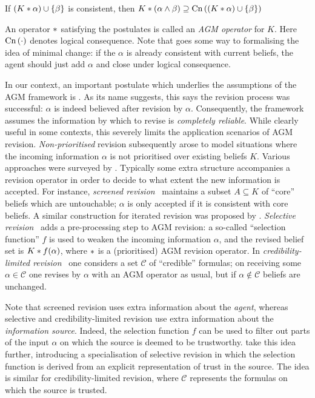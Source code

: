 {\begin{axiomlist}
    \begin{axiom}
        If $(K \ast \alpha) \cup \{\beta\}$ is consistent, then $K
        \ast (\alpha \land \beta) \supseteq \operatorname{Cn}\left({(K \ast \alpha) \cup
        \{\beta\}}\right)$
    \end{axiom}

\end{axiomlist}

An operator $\ast$ satisfying the postulates is called an \emph{AGM
operator} for $K$. Here $\operatorname{Cn}\left({\cdot}\right)$ denotes logical consequence.
%
Note that  goes some way to formalising the idea of minimal
change: if the $\alpha$ is already consistent with current beliefs, the agent
should just add $\alpha$ and close under logical consequence.

In our context, an important postulate which underlies the assumptions of the
AGM framework is . As its name suggests, this says the
revision process was successful: $\alpha$ is indeed believed after revision by
$\alpha$. Consequently, the framework assumes the information by which to
revise is \emph{completely reliable}. While clearly useful in some contexts,
this severely limits the application scenarios of AGM revision.
\emph{Non-prioritised} revision subsequently arose to model situations where
the incoming information $\alpha$ is not prioritised over existing beliefs $K$.
Various approaches were surveyed by \textcite{hansson1999survey}. Typically
some extra structure accompanies a revision operator in order to decide to what
extent the new information is accepted. For instance, \emph{screened
revision}~\cite{makinson1997screened} maintains a subset $A \subseteq K$ of
``core'' beliefs which are untouchable; $\alpha$ is only accepted if it is
consistent with core beliefs. A similar construction for iterated revision was
proposed by \textcite{booth2005}. \emph{Selective
revision}~\cite{ferme1999selective} adds a pre-processing step to AGM revision:
a so-called ``selection function'' $f$ is used to weaken the incoming
information $\alpha$, and the revised belief set is $K \ast f(\alpha)$,
where $\ast$ is a (prioritised) AGM revision operator. In
\emph{credibility-limited revision}~\cite{hansson_2001} one considers a set
$\mathcal{C}$ of ``credible'' formulas; on receiving some $\alpha \in
\mathcal{C}$ one revises by $\alpha$ with an AGM operator as usual, but if
$\alpha \notin \mathcal{C}$ beliefs are unchanged.

Note that screened revision uses extra information about the \emph{agent},
whereas selective and credibility-limited revision use extra information about
the \emph{information source}. Indeed, the selection function $f$ can be used
to filter out parts of the input $\alpha$ on which the source is deemed to be
trustworthy. \textcite{booth_trust_2018} take this idea further, introducing a
specialisation of selective revision in which the selection function is derived
from an explicit representation of trust in the source. The idea is similar for
credibility-limited revision, where $\mathcal{C}$ represents the formulas on
which the source is trusted.

}
